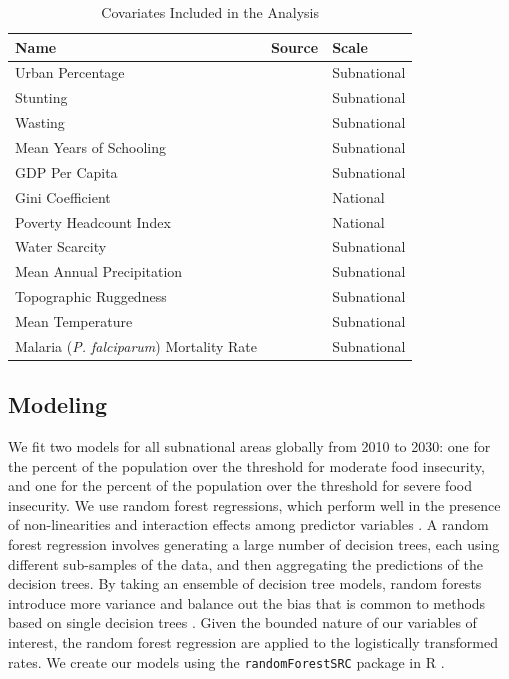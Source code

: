 \documentclass{article}
\begin{document}
\begin{table}[H]
  \centering
	\begin{tabular}{lll}
		\toprule
    Name & Source & Scale \\
		\midrule
    Urban Percentage & \citep{Jones2016} & Subnational \\
    Stunting & \citep{Local2020} & Subnational \\
    Wasting & \citep{Local2020} & Subnational \\
    Mean Years of Schooling & \citep{Smits2019, KC2017} & Subnational\\
    GDP Per Capita & \citep{Smits2019, Dellink2017} & Subnational \\
    Gini Coefficient & \citep{Rao2019a} & National\\
    Poverty Headcount Index & \citep{Cuaresma2018} & National \\
    Water Scarcity & \citep{greve2018global} & Subnational \\
    Mean Annual Precipitation &  \cite{abatzoglou2018terraclimate, warszawski2014inter} & Subnational \\
    Topographic Ruggedness &  \cite{USGS1996, Riley1999} & Subnational \\
    Mean Temperature &  \cite{abatzoglou2018terraclimate, warszawski2014inter} & Subnational \\
    Malaria (\textit{P. falciparum}) Mortality Rate &  \cite{Weiss2019} & Subnational \\
		\bottomrule
	\end{tabular}
	\caption{Covariates Included in the Analysis}
	\label{tab:covars}
\end{table}


\subsection{Modeling}
We fit two models for all subnational areas globally from 2010 to 2030: one for the percent of the population over the threshold for moderate food insecurity, and one for the percent of the population over the threshold for severe food insecurity.  We use random forest regressions, which perform well in the presence of non-linearities and interaction effects among predictor variables \citep{hastie2009elements}.  A random forest regression involves generating a large number of decision trees, each using different sub-samples of the data, and then aggregating the predictions of the decision trees.  By taking an ensemble of decision tree models, random forests introduce more variance and balance out the bias that is common to methods based on single decision trees \citep{friedman2001elements}. Given the bounded nature of our variables of interest, the random forest regression are applied to the logistically transformed rates.  We create our models using the \texttt{randomForestSRC} package in R \citep{ishwaran2019randomforestsrc}.
\end{document}
